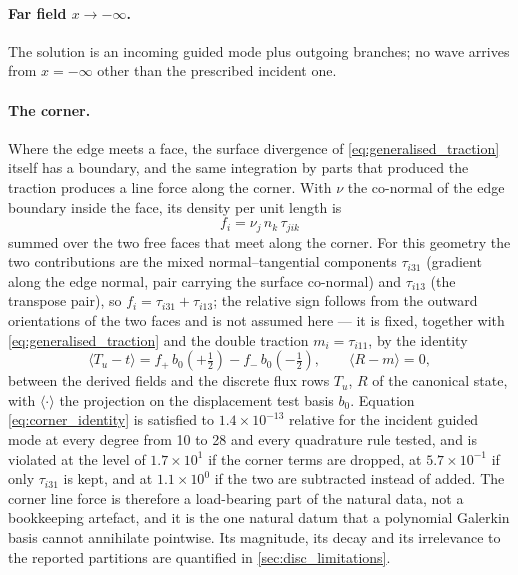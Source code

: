 \paragraph{Far field $x\to-\infty$.}  The solution is an incoming guided mode
plus outgoing branches; no wave arrives from $x=-\infty$ other than the
prescribed incident one.

\paragraph{The corner.}  Where the edge meets a face, the surface divergence of
\eqref{eq:generalised_traction} itself has a boundary, and the same integration by
parts that produced the traction produces a line force along the corner.  With
$\nu$ the co-normal of the edge boundary inside the face, its density per unit
length is
\begin{equation}
\label{eq:corner_force}
f_i=\nu_j\,n_k\,\tau_{jik}
\end{equation}
summed over the two free faces that meet along the corner.  For this geometry the
two contributions are the mixed normal--tangential components $\tau_{i31}$
(gradient along the edge normal, pair carrying the surface co-normal) and
$\tau_{i13}$ (the transpose pair), so
$f_i=\tau_{i31}+\tau_{i13}$; the relative sign follows from the outward
orientations of the two faces and is not assumed here --- it is fixed, together
with \eqref{eq:generalised_traction} and the double traction $m_i=\tau_{i11}$, by
the identity
\begin{equation}
\label{eq:corner_identity}
\bigl\langle T_{\!u}-t\bigr\rangle
=f_+\,b_0(+\tfrac12)-f_-\,b_0(-\tfrac12),
\qquad
\bigl\langle R-m\bigr\rangle=0 ,
\end{equation}
between the derived fields and the discrete flux rows $T_{\!u}$, $R$ of the
canonical state, with $\langle\cdot\rangle$ the projection on the displacement
test basis $b_0$.  Equation \eqref{eq:corner_identity} is satisfied to
$1.4\times10^{-13}$ relative for the incident guided mode at every degree from 10
to 28 and every quadrature rule tested, and is violated at the level of
$1.7\times10^{1}$ if the corner terms are dropped, at $5.7\times10^{-1}$ if only
$\tau_{i31}$ is kept, and at $1.1\times10^{0}$ if the two are subtracted instead
of added.  The corner line force is therefore a load-bearing part of the natural
data, not a bookkeeping artefact, and it is the one natural datum that a
polynomial Galerkin basis cannot annihilate pointwise.  Its magnitude, its decay
and its irrelevance to the reported partitions are quantified in
\cref{sec:disc_limitations}.


